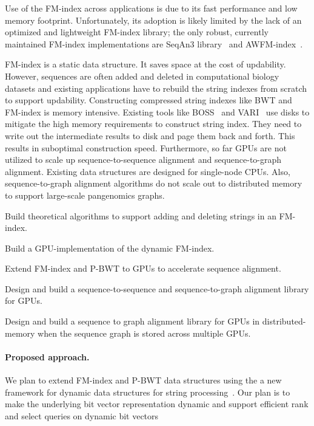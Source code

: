 Use of the FM-index across applications is due to its fast performance and low memory footprint. Unfortunately, its adoption is likely limited by the lack of an optimized and lightweight FM-index library; the only robust, currently maintained FM-index implementations are SeqAn3 library~\cite{Reinert2017} and AWFM-index~\cite{Anderson2021}.

FM-index is a static data structure. It saves space at the cost of updability. However, sequences are often added and deleted in computational biology datasets and existing applications have to rebuild the string indexes from scratch to support updability. 
%
Constructing compressed string indexes like BWT and FM-index is memory intensive. Existing tools like BOSS~\cite{Bowe2012} and VARI~\cite{Muggli2019} use disks to mitigate the high memory requirements to construct string index. They need to write out the intermediate results to disk and page them back and forth. This results in suboptimal construction speed.
%
Furthermore, so far GPUs are not utilized to scale up sequence-to-sequence alignment and sequence-to-graph alignment. Existing data structures are designed for single-node CPUs. Also, sequence-to-graph alignment algorithms do not scale out to distributed memory to support large-scale pangenomics graphs.

\begin{rproblem}
Build theoretical algorithms to support adding and deleting strings in an FM-index.
\label{rpob:dynamic-fmindex}
\end{rproblem}

\begin{rproblem}
Build a GPU-implementation of the dynamic FM-index.
\label{rpob:gpu-fmindex}
\end{rproblem}

\begin{rproblem}
Extend FM-index and P-BWT to GPUs to accelerate sequence alignment.
\end{rproblem}

\begin{rproblem}
Design and build a sequence-to-sequence and sequence-to-graph alignment library for GPUs.
\end{rproblem}


\begin{rproblem}
Design and build a sequence to graph alignment library for GPUs in distributed-memory when the sequence graph is stored across multiple GPUs.
\end{rproblem}

\paragraph{Proposed approach.}
We plan to extend FM-index and P-BWT data structures using the a new framework for dynamic data structures for string processing~\cite{Nicola17,Farzan2011}. Our plan is to make the underlying bit vector representation dynamic and support efficient rank and select queries on dynamic bit vectors~\cite{}

